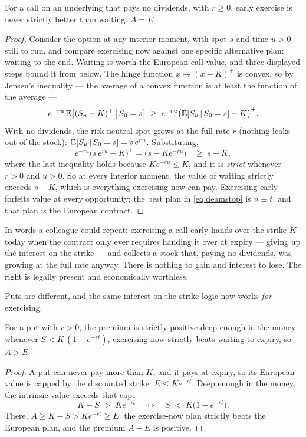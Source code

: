 \begin{theorem}
\label{thm:deammerton}
For a call on an underlying that pays no dividends, with $r\ge0$,
early exercise is never strictly better than waiting: $A=E$
\citep{Merton1973}.
\end{theorem}

\begin{proof}
Consider the option at any interior moment, with spot $s$ and time $u>0$
still to run, and compare exercising now against one specific
alternative plan: waiting to the end.  Waiting is worth the European
call value, and three displayed steps bound it from below.  The hinge
function $x\mapsto(x-K)^+$ is convex, so by Jensen's inequality ---
the average of a convex function is at least the function of the
average ---
\[
e^{-ru}\,\mathbb{E}\big[(S_u-K)^+ \,\big|\, S_0=s\big]
\;\ge\;
e^{-ru}\big(\mathbb{E}[S_u\,|\,S_0=s]-K\big)^{+}.
\]
With no dividends, the risk-neutral spot grows at the full rate $r$
(nothing leaks out of the stock): $\mathbb{E}[S_u\,|\,S_0=s]=s\,e^{ru}$.
Substituting,
\[
e^{-ru}\big(s\,e^{ru}-K\big)^{+}
=\big(s-Ke^{-ru}\big)^{+}
\;\ge\; s-K,
\]
where the last inequality holds because $Ke^{-ru}\le K$, and it is
\emph{strict} whenever $r>0$ and $u>0$.  So at every interior moment,
the value of waiting strictly exceeds $s-K$, which is everything
exercising now can pay.  Exercising early forfeits value at every
opportunity; the best plan in \eqref{eq:deamstop} is
$\vartheta\equiv t$, and that plan is the European contract.
\end{proof}

In words a colleague could repeat: exercising a call early hands over
the strike $K$ today when the contract only ever requires handing it
over at expiry --- giving up the interest on the strike --- and
collects a stock that, paying no dividends, was growing at the full
rate anyway.  There is nothing to gain and interest to lose.  The
right is legally present and economically worthless.

Puts are different, and the same interest-on-the-strike logic now
works \emph{for} exercising.

\begin{proposition}
\label{prop:deamput}
For a put with $r>0$, the premium is strictly positive deep enough in
the money: whenever $S<K\,(1-e^{-rt})$, exercising now strictly beats
waiting to expiry, so $A>E$.
\end{proposition}

\begin{proof}
A put can never pay more than $K$, and it pays at expiry, so its
European value is capped by the discounted strike: $E\le Ke^{-rt}$.
Deep enough in the money, the intrinsic value exceeds that cap:
\[
K-S\;>\;Ke^{-rt}
\quad\Longleftrightarrow\quad
S\;<\;K\big(1-e^{-rt}\big).
\]
There, $A\ge K-S>Ke^{-rt}\ge E$: the exercise-now plan strictly beats
the European plan, and the premium $A-E$ is positive.
\end{proof}

